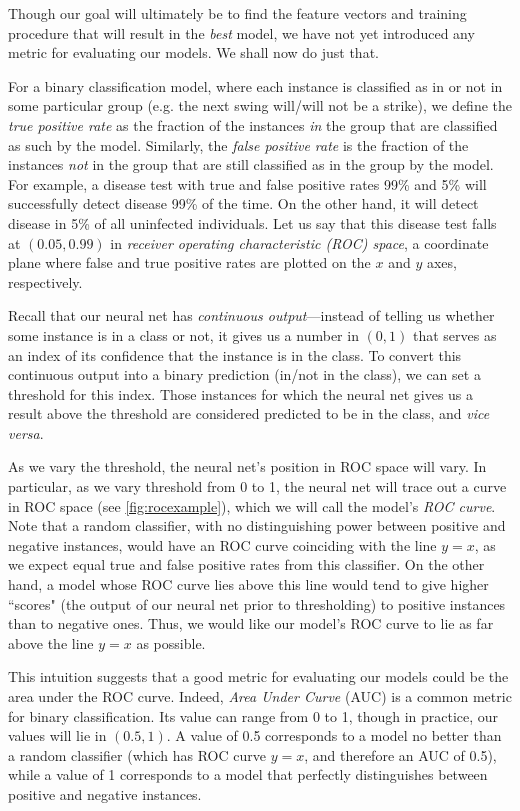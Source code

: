 \documentclass[10pt]{article}
\begin{document}
Though our goal will ultimately be to find the feature vectors and training procedure that will result in the \emph{best} model, we have not yet introduced any metric for evaluating our models.
We shall now do just that.

For a binary classification model, where each instance is classified as in or not in some particular group (e.g. the next swing will/will not be a strike), we define the \emph{true positive rate} as the fraction of the instances \emph{in} the group that are classified as such by the model.
Similarly, the \emph{false positive rate} is the fraction of the instances \emph{not} in the group that are still classified as in the group by the model.
For example, a disease test with true and false positive rates 99\% and 5\% will successfully detect disease 99\% of the time.
On the other hand, it will detect disease in 5\% of all uninfected individuals.
Let us say that this disease test falls at $(0.05, 0.99)$ in \emph{receiver operating characteristic (ROC) space}, a coordinate plane where false and true positive rates are plotted on the $x$ and $y$ axes, respectively.

Recall that our neural net has \emph{continuous output}---instead of telling us whether some instance is in a class or not, it gives us a number in $(0, 1)$ that serves as an index of its confidence that the instance is in the class.
To convert this continuous output into a binary prediction (in/not in the class), we can set a threshold for this index.
Those instances for which the neural net gives us a result above the threshold are considered predicted to be in the class, and \emph{vice versa}.

As we vary the threshold, the neural net's position in ROC space will vary.
In particular, as we vary threshold from 0 to 1, the neural net will trace out a curve in ROC space (see \cref{fig:rocexample}), which we will call the model's \emph{ROC curve}.
Note that a random classifier, with no distinguishing power between positive and negative instances, would have an ROC curve coinciding with the line $y = x$, as we expect equal true and false positive rates from this classifier.
On the other hand, a model whose ROC curve lies above this line would tend to give higher ``scores" (the output of our neural net prior to thresholding) to positive instances than to negative ones.
Thus, we would like our model's ROC curve to lie as far above the line $y = x$ as possible.

This intuition suggests that a good metric for evaluating our models could be the area under the ROC curve.
Indeed, \emph{Area Under Curve} (AUC) is a common metric for binary classification.
Its value can range from 0 to 1, though in practice, our values will lie in $(0.5, 1)$.
A value of 0.5 corresponds to a model no better than a random classifier (which has ROC curve $y = x$, and therefore an AUC of 0.5), while a value of 1 corresponds to a model that perfectly distinguishes between positive and negative instances.
\end{document}
